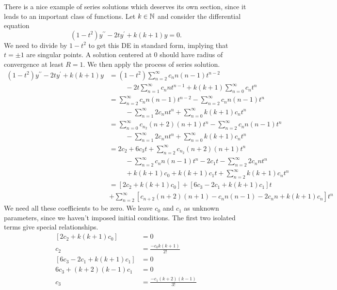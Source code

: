 \documentclass[fleqn,letterpaper]{report}
\begin{document}
There is a nice example of series solutions which deserves its
own section, since it leads to an important class of
functions. Let $k \in \mathbb{N}$ and consider the differential
equation
\begin{equation*}
(1-t^2)y^{\prime \prime} - 2ty^\prime + k(k+1)y=0.
\end{equation*}
 We need to divide by $1-t^2$ to get this DE in standard form,
implying that $t = \pm1$ are singular points. A solution
centered at $0$ should have radius of convergence at least $R=1$. We
then apply the process of series solution.
\begin{align*}
(1-t^2)y^{\prime \prime} - 2ty^\prime + k(k+1) y & = 
(1-t^2) \sum_{n=2}^\infty c_n n(n-1)t^{n-2} \\
& \hspace{1cm} - 2t \sum_{n=1}^\infty c_n nt^{n-1} 
+k(k+1) \sum_{n=0}^\infty c_n t^n \\
& = \sum_{n=2}^\infty c_n n (n-1)t^{n-2}
- \sum_{n=2}^\infty c_n n(n-1) t^n \\
& \hspace{1cm} - \sum_{n=1}^\infty 2c_n n t^n 
+ \sum_{n=0}^\infty k(k+1) c_n t^n \\
& = \sum_{n=0}^\infty c_{n_2} (n+2) (n+1)t^n
- \sum_{n=2}^\infty c_n n(n-1) t^n \\
& \hspace{1cm} - \sum_{n=1}^\infty 2c_n n t^n 
+ \sum_{n=0}^\infty k(k+1) c_n t^n \\
& = 2c_2 + 6c_3 t + \sum_{n=2}^\infty c_{n_2} (n+2) (n+1)t^n \\
& \hspace{1cm} - \sum_{n=2}^\infty c_n n(n-1) t^n 
-2c_1 t - \sum_{n=2}^\infty 2c_n n t^n \\
& \hspace{1cm} + k(k+1) c_0 + k(k+1) c_1 t + \sum_{n=2}^\infty
k(k+1) c_n t^n \\ 
& = \left[ 2c_2 + k(k+1) c_0 \right] + \left[ 6c_3 - 2c_1 +
k(k+1) c_1 \right] t \\
& + \sum_{n=2}^\infty \left[ 
c_{n+2} (n+2) (n+1) - c_n n(n-1) - 2c_n n 
+ k(k+1) c_n \right] t^n 
\end{align*}
We need all these coefficients to be zero. We 
leave $c_0$ and $c_1$ as unknown parameters, since we haven't
imposed initial conditions. The first two isolated terms give
special relationships.
\begin{align*}
\left[ 2c_2 + k(k+1) c_0 \right] & = 0 \\
c_2 & = \frac{-c_0 k (k+1)}{2!} \\
\left[ 6c_3 - 2c_1 + k(k+1) c_1 \right] & = 0 \\ 
6c_3 + (k+2)(k-1) c_1 & = 0 \\
c_3 & = \frac{-c_1 (k+2)(k-1)}{3!} 
\end{align*}
\end{document}
